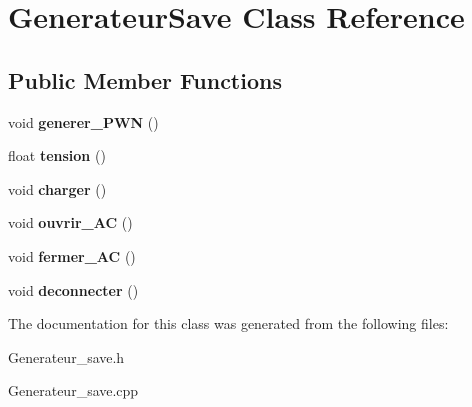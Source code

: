 \hypertarget{classGenerateurSave}{}\section{Generateur\+Save Class Reference}
\label{classGenerateurSave}
\subsection*{Public Member Functions}
\begin{DoxyCompactItemize}
\item 
\mbox{\label{classGenerateurSave_accf81cd3125f689918d7a10ce765ed31}} 
void {\bfseries generer\+\_\+\+P\+WN} ()
\item 
\mbox{\label{classGenerateurSave_a4e934c3844a78b181cab4f2eb3335fbe}} 
float {\bfseries tension} ()
\item 
\mbox{\label{classGenerateurSave_a0da4a9688fd39f8de1c52bdaea262332}} 
void {\bfseries charger} ()
\item 
\mbox{\label{classGenerateurSave_ad5fcd732d01eb9c63777412900f4e7cb}} 
void {\bfseries ouvrir\+\_\+\+AC} ()
\item 
\mbox{\label{classGenerateurSave_a73df5cee4031fffe92fc35454602ca46}} 
void {\bfseries fermer\+\_\+\+AC} ()
\item 
\mbox{\label{classGenerateurSave_a0e4405ef904cab01fdc656c4afa56a9c}} 
void {\bfseries deconnecter} ()
\end{DoxyCompactItemize}


The documentation for this class was generated from the following files\+:\begin{DoxyCompactItemize}
\item 
Generateur\+\_\+save.\+h\item 
Generateur\+\_\+save.\+cpp\end{DoxyCompactItemize}
